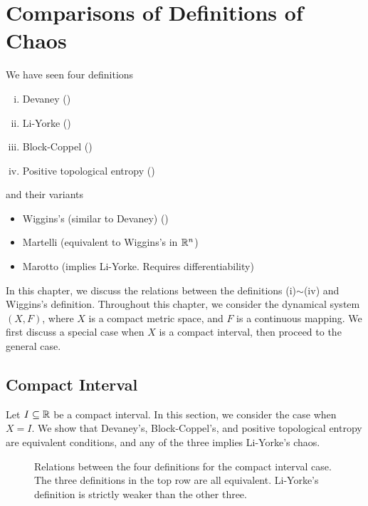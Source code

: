 \documentclass[12pt,twoside,draft]{book}
\begin{document}
\chapter{Comparisons of Definitions of Chaos}
We have seen four definitions 
\begin{enumerate}[(i)]
  \item Devaney (\dev)
  \item Li-Yorke (\liy)
  \item Block-Coppel (\blcp)
  \item Positive topological entropy (\pte)
\end{enumerate}
and their variants
\begin{itemize}
  \item Wiggins's (similar to Devaney) (\wig)
  \item Martelli (equivalent to Wiggins's in $\mathbb{R}^n$)
  \item Marotto (implies Li-Yorke. Requires differentiability)
\end{itemize}
In this chapter, we discuss the relations between the definitions (i)$\sim$(iv) and Wiggins's definition.
Throughout this chapter, we consider the dynamical system $(X,F)$, where $X$ is a compact metric space, and $F$ is a continuous mapping.
We first discuss a special case when $X$ is a compact interval, then proceed to the general case.

\section{Compact Interval}
Let $I \subseteq \mathbb{R}$ be a compact interval.
In this section, we consider the case when $X = I$.
We show that Devaney's, Block-Coppel's, and positive topological entropy are equivalent conditions, and any of the three implies Li-Yorke's chaos.
\begin{figure}[ht]
  \label{fig:chaos-interval}
  \caption{
    Relations between the four definitions for the compact interval case.
    The three definitions in the top row are all equivalent.
    Li-Yorke's definition is strictly weaker than the other three.
  }
\end{figure}
\end{document}
